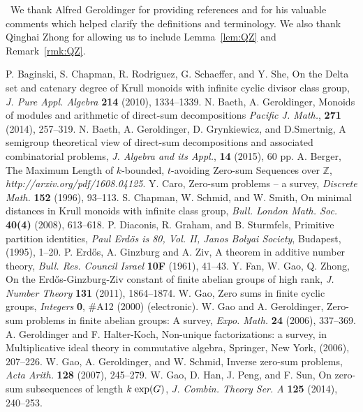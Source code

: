 \documentclass[12 pt]{amsart}
\def \n{\noindent }
\def \bs{\bigskip}
\def \Z{\mathbb Z}
\def \Z{\mathbb Z}
\begin{document}
%
\bs\n{\bf Acknowledgement:}\
We thank Alfred Geroldinger for providing 
references and for his valuable comments which helped 
clarify the definitions and terminology. We also thank Qinghai Zhong for allowing us to include Lemma~\ref{lem:QZ} and Remark~\ref{rmk:QZ}.
\begin{thebibliography}{18}
 P. Baginski, S. Chapman, R. Rodriguez, G. Schaeffer, and Y. She, 
On the Delta set and catenary degree of Krull monoids with infinite cyclic divisor class group, 
{\em J. Pure Appl. Algebra} {\bf  214} (2010), 1334--1339.
 N. Baeth, A. Geroldinger, Monoids of modules and arithmetic of direct-sum decompositions
{\em Pacific J. Math.}, {\bf 271} (2014), 257--319.
 N. Baeth, A. Geroldinger, D. Grynkiewicz, 
and D.Smertnig,  A semigroup theoretical view of direct-sum decompositions and associated combinatorial problems,
{\em J. Algebra and its Appl.}, {\bf 14} (2015), 60 pp. 
 A. Berger, The Maximum Length of $k$-bounded, $t$-avoiding Zero-sum Sequences over $\Z$, {\em http://arxiv.org/pdf/1608.04125}.
\bibitem{C} Y. Caro, Zero-sum problems -- a survey, {\em Discrete Math.} {\bf 152} (1996), 93--113.
\bibitem{CSS} S. Chapman, W. Schmid, and W. Smith, On minimal distances in Krull monoids with infinite class group,
{\em  Bull. London Math. Soc.} {\bf 40(4)} (2008), 613--618. 
 P. Diaconis, R. Graham, and B. Sturmfels, Primitive partition identities,
{\em Paul Erd\"os is 80, Vol. II, Janos Bolyai Society}, Budapest, (1995), 1--20.
\bibitem{EGZ} P. Erd{\H{o}}s, A. Ginzburg and A. Ziv, A theorem in additive number theory,
{\em Bull. Res. Council Israel} {\bf 10F} (1961), 41--43.
 Y. Fan, W. Gao, Q. Zhong, On the Erd{\H{o}}s-Ginzburg-Ziv constant of finite abelian groups of high rank, {\em J. Number Theory} {\bf 131} (2011), 1864--1874.
\bibitem{Ga} W. Gao, Zero sums in finite cyclic groups,
{\em Integers} {\bf 0}, \#A12 (2000) (electronic).
 W. Gao and A. Geroldinger,  Zero-sum problems in finite abelian groups: A survey, {\em Expo. Math.} {\bf 24} (2006), 337--369.
\bibitem{GHK} A. Geroldinger and F. Halter-Koch, Non-unique factorizations: a survey, 
in Multiplicative ideal theory in commutative algebra, 
Springer, New York, (2006), 207--226.
 W. Gao, A. Geroldinger, and W. Schmid, 
Inverse zero-sum problems, {\em Acta Arith.} {\bf 128} (2007), 
245--279.
 W. Gao, D. Han, J. Peng, and F. Sun, On zero-sum subsequences of length $k\;{\rm exp}(G)$,
{\em J. Combin. Theory Ser. A} {\bf 125} (2014), 240--253.

\end{thebibliography}
\end{document}
